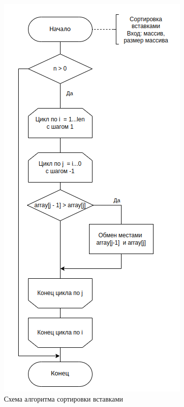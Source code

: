 \begin{figure}[h]
	\centering
	\includegraphics[height=0.8\textheight]{img/insert.png}
	\caption{Схема алгоритма сортировки вставками}
	\label{fig:insert}
\end{figure}

\clearpage

